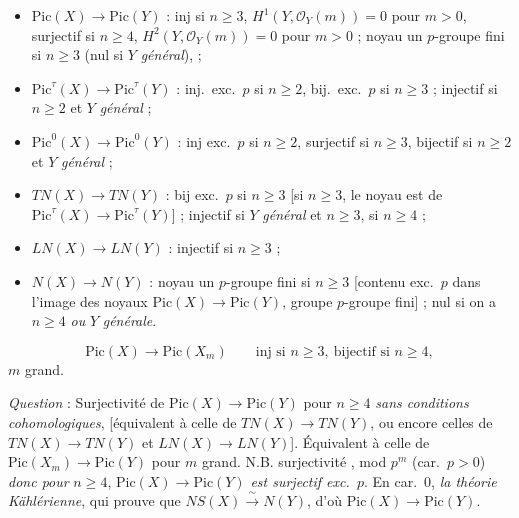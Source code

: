\documentclass[11pt,a4paper]{article}
\begin{document}
\begin{itemize}
  \item $\mathrm{Pic}(X) \to \mathrm{Pic}(Y)$ : inj si $n \geqslant 3$, $H^1(Y, \mathcal{O}_Y(m)) = 0$ pour $m > 0$, surjectif si $n \geqslant 4$, $H^2(Y, \mathcal{O}_Y(m)) = 0$ pour $m > 0$  ; noyau un $p$-groupe fini si $n \geqslant 3$ (nul si $Y$ \emph{général}),   ;
  \item $\mathrm{Pic}^{\tau}(X) \to \mathrm{Pic}^{\tau}(Y)$ : inj.\ exc.\ $p$ si $n \geqslant 2$, bij.\ exc.\ $p$ si $n \geqslant 3$ ; injectif si $n \geqslant 2$ et $Y$ \emph{général}  ;
  \item $\mathrm{Pic}^{0}(X) \to \mathrm{Pic}^{0}(Y)$ : inj exc.\ $p$ si $n \geqslant 2$, surjectif si $n \geqslant 3$, bijectif si $n \geqslant 2$ et $Y$ \emph{général}  ;
  \item $TN(X) \to TN(Y)$ : bij exc.\ $p$ si $n \geqslant 3$ [si $n \geqslant 3$, le noyau est \struck{\ill{}}  de $\mathrm{Pic}^{\tau}(X) \to \mathrm{Pic}^{\tau}(Y)$] ; injectif si $Y$ \emph{général} et $n \geqslant 3$, \struck{\ill{}} si $n \geqslant 4$ ;
  \item $LN(X) \to LN(Y)$ : injectif si $n \geqslant 3$ ;
  \item $N(X) \to N(Y)$ : noyau un $p$-groupe fini si $n \geqslant 3$ [contenu exc.\ $p$ dans l'image des noyaux  $\mathrm{Pic}(X) \to \mathrm{Pic}(Y)$, groupe  $p$-groupe fini] ; nul si on a $n \geqslant 4$ \emph{ou} $Y$ \emph{générale}.
\end{itemize}
\[
  \mathrm{Pic}(X) \longrightarrow \mathrm{Pic}(X_m) \qquad \text{inj si } n \geqslant 3,\ \text{bijectif si } n \geqslant 4,
\]
$m$ grand.

\emph{Question} : Surjectivité  de $\mathrm{Pic}(X) \to \mathrm{Pic}(Y)$ \struck{\ill{}} pour $n \geqslant 4$ \emph{sans conditions cohomologiques}, [équivalent à celle de $TN(X) \to TN(Y)$, ou encore celles de $TN(X) \to TN(Y)$ et $LN(X) \to LN(Y)$]. Équivalent à celle de $\mathrm{Pic}(X_m) \to \mathrm{Pic}(Y)$ pour $m$ grand. N.B.  surjectivité , \ill{} \ill{} mod $p^m$ (car.\ $p > 0$)  \emph{donc pour} $n \geqslant 4$, $\mathrm{Pic}(X) \to \mathrm{Pic}(Y)$ \emph{est surjectif exc.\ $p$}. \struck{\ill{}} En car.\ $0$,  \emph{} \emph{la théorie Kählérienne}, qui prouve que \struck{\ill{}} $NS(X) \xrightarrow{\ \sim\ } N(Y)$, d'où $\mathrm{Pic}(X) \to \mathrm{Pic}(Y)$.
\end{document}
